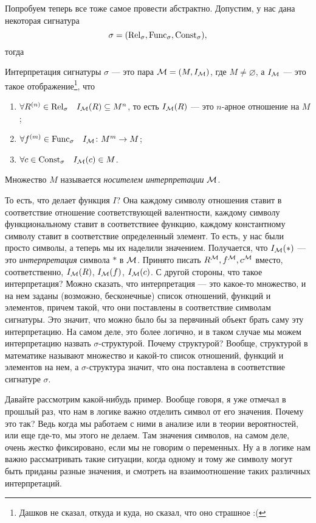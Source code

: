 Попробуем теперь все тоже самое провести абстрактно.
Допустим, у нас дана некоторая сигнатура 
$$
    \sigma = (\mathrm{Rel}_{\sigma}, \mathrm{Func}_{\sigma}, \mathrm{Const}_{\sigma}),
$$
тогда
\begin{definition}
    Интерпретация сигнатуры $\sigma$ --- это пара $\mathcal{M} = (M, I_{\mathcal{M}})$, где $M \neq \varnothing$, а $I_{\mathcal{M}}$ --- это такое отображение\footnote{Дашков не сказал, откуда и куда, но сказал, что оно страшное :(}, что
    \begin{enumerate}
        \item $\forall R^{(n)} \in \mathrm{Rel}_{\sigma} \quad I_{\mathcal{M}}(R) \subseteq M^{n}$, то есть $I_{\mathcal{M}}(R)$ --- это $n$-арное отношение на $M$;
        \item $\forall f^{(m)} \in \mathrm{Func}_{\sigma} \quad I_{\mathcal{M}} \colon M^{m} \to M$;
        \item $\forall c \in \mathrm{Const}_{\sigma} \quad I_{\mathcal{M}}(c) \in M$.
    \end{enumerate}
    Множество $M$ называется {\it носителем интерпретации} $\mathcal{M}$.
\end{definition}
То есть, что делает функция $I$?
Она каждому символу отношения ставит в соответствие отношение соответствующей валентности, каждому символу функциональному ставит в соответствиее функцию, каждому константному символу ставит в соответствие определенный элемент.
То есть, у нас были просто символы, а теперь мы их наделили значением.
Получается, что $I_{\mathcal{M}}(*)$ --- это {\it интерпретация} символа $*$ в $\mathcal{M}$.
Принято писать $R^{\mathcal{M}}, f^{\mathcal{M}}, c^{\mathcal{M}}$ вместо, соответственно, $I_{\mathcal{M}}(R)$, $I_{\mathcal{M}}(f)$, $I_{\mathcal{M}}(c)$.
С другой стороны, что такое интерпретация?
Можно сказать, что интерпретация --- это какое-то множество, и на нем заданы (возможно, бесконечные) список отношений, функций и элементов, причем такой, что они поставлены в соответствие символам сигнатуры.
Это значит, что можно было бы за первчиный объект брать саму эту интерпретацию.
На самом деле, это более логично, и в таком случае мы можем интерпретацию назвать $\sigma$-структурой.
Почему структурой?
Вообще, структурой в математике называют множество и какой-то список отношений, функций и элементов на нем, а $\sigma$-структура значит, что она поставлена в соответствие сигнатуре $\sigma$.

Давайте рассмотрим какой-нибудь пример.
Вообще говоря, я уже отмечал в прошлый раз, что нам в логике важно отделить символ от его значения.
Почему это так?
Ведь когда мы работаем с ними в анализе или в теории вероятностей, или еще где-то, мы этого не делаем.
Там значения символов, на самом деле, очень жестко фиксировано, если мы не говорим о переменных.
Ну а в логике нам важно рассматривать такие ситуации, когда одному и тому же символу могут быть приданы разные значения, и смотреть на взаимоотношение таких различных интерпретаций.

